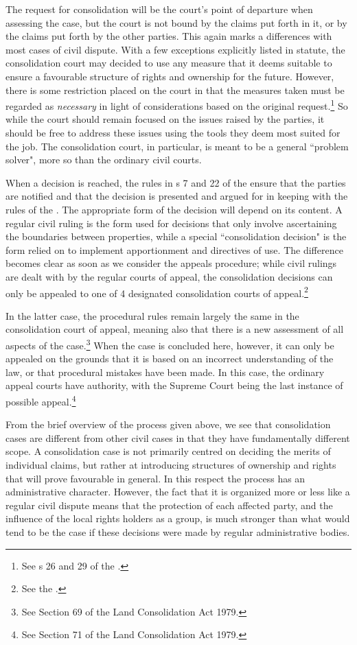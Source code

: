 The request for consolidation will be the court's point of departure when assessing the case, but the court is not bound by the claims put forth in it, or by the claims put forth by the other parties. This again marks a differences with most cases of civil dispute. With a few exceptions explicitly listed in statute, the consolidation court may decided to use any measure that it deems suitable to ensure a favourable structure of rights and ownership for the future. However, there is some restriction placed on the court in that the measures taken must be regarded as \emph{necessary} in light of considerations based on the original request.\footnote{See s 26 and 29 of the \cite{lca79}.} So while the court should remain focused on the issues raised by the parties, it should be free to address these issues using the tools they deem most suited for the job. The consolidation court, in particular, is meant to be a general ``problem solver", more so than the ordinary civil courts.

When a decision is reached, the rules in s 7 and 22 of the \cite{lca79} ensure that the parties are notified and that the decision is presented and argued for in keeping with the rules of the \cite{cda05}. The appropriate form of the decision will depend on its content. A regular civil ruling is the form used for decisions that only involve ascertaining the boundaries between properties, while a special ``consolidation decision" is the form relied on to implement apportionment and directives of use. The difference becomes clear as soon as we consider the appeals procedure; while civil rulings are dealt with by the regular courts of appeal, the consolidation decisions can only be appealed to one of 4 designated consolidation courts of appeal.\footnote{See  the \cite[61]{lca79}.}

In the latter case, the procedural rules remain largely the same in the consolidation court of appeal, meaning also that there is a new assessment of all aspects of the case.\footnote{See Section 69 of the Land Consolidation Act 1979.} When the case is concluded here, however, it can only be appealed on the grounds that it is based on an incorrect understanding of the law, or that procedural mistakes have been made. In this case, the ordinary appeal courts have authority, with the Supreme Court being the last instance of possible appeal.\footnote{See Section 71 of the Land Consolidation Act 1979.}

From the brief overview of the process given above, we see that consolidation cases are different from other civil cases in that they have fundamentally different scope. A consolidation case is not primarily centred on deciding the merits of individual claims, but rather at introducing structures of ownership and rights that will prove favourable in general. In this respect the process has an administrative character. However, the fact that it is organized more or less like a regular civil dispute means that the protection of each affected party, and the influence of the local rights holders as a group, is much stronger than what would tend to be the case if these decisions were made by regular administrative bodies.

